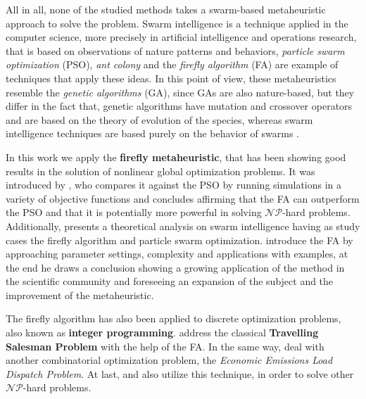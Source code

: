 \documentclass[tuberlin,cic,tc,openright,english,noabntcite,oneside]{iiufrgs}
\begin{document}
All in all, none of the studied methods takes a swarm-based metaheuristic approach to solve the problem. Swarm intelligence is a technique applied in the computer science, more precisely in artificial intelligence and operations research, that is based on observations of nature patterns and behaviors, \emph{particle swarm optimization} (PSO), \emph{ant colony} and the \emph{firefly algorithm} (FA) are example of techniques that apply these ideas. In this point of view, these metaheuristics resemble the \emph{genetic algorithms} (GA), since GAs are also nature-based, but they differ in the fact that, genetic algorithms have mutation and crossover operators and are based on the theory of evolution of the species, whereas swarm intelligence techniques are based purely on the behavior of swarms \parencite[p. 189-190]{yang_efficiency_2012}.

In this work we apply the \textbf{firefly metaheuristic}, that has been showing good results in the solution of nonlinear global optimization problems. It was introduced by \textcite{yang_firefly_2009}, who compares it against the PSO by running simulations in a variety of objective functions and concludes affirming that the FA can outperform the PSO and that it is potentially more powerful in solving $\mathcal{NP}$-hard problems. Additionally, \textcite{yang_efficiency_2012} presents a theoretical analysis on swarm intelligence having as study cases the firefly algorithm and particle swarm optimization. \textcite{yang_firefly_2013} introduce the FA by approaching parameter settings, complexity and applications with examples, at the end he draws a conclusion showing a growing application of the method in the scientific community and foreseeing an expansion of the subject and the improvement of the metaheuristic.

The firefly algorithm has also been applied to discrete optimization problems, also known as \textbf{integer programming}. \textcite{jati_evolutionary_2011} address the classical \textbf{Travelling Salesman Problem} with the help of the FA. In the same way, \textcite{apostolopoulos_application_2010} deal with another combinatorial optimization problem, the \emph{Economic Emissions Load Dispatch Problem}. At last, \textcite{sayadi_discrete_2010} and \textcite{sayadi_firefly-inspired_2013} also utilize this technique, in order to solve other $\mathcal{NP}$-hard problems.

\end{document}
